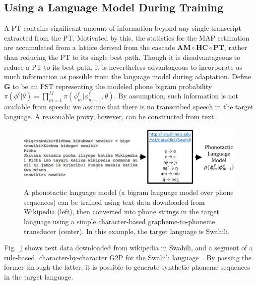 \subsection{Using a Language Model During Training}
\label{sec:trainwithlm}

A PT contains significant amount of information beyond any single
transcript extracted from the PT. Motivated by this, the statistics
for the MAP estimation are accumulated from a lattice derived from the
cascade $\mathbf{AM} \circ \mathbf{HC} \circ \mathbf{PT}$, rather than
reducing the PT to its single best path. Though it is disadvantageous
to reduce a PT to its best path, it is nevertheless advantageous to
incorporate as much information as possible from the language model
during adaptation.  Define $\mathbf{G}$ to be an FST representing the
modeled phone bigram probability
$\pi(\phi^\ell|\theta)=\prod_{m=1}^M\pi(\phi_m^\ell|\phi_{m-1}^\ell,\theta)$.
By assumption, such information is not available from speech: we
assume that there is no transcribed speech in the target language.  A
reasonable proxy, however, can be constructed from text.

\begin{figure}
  \centerline{\includegraphics[width=5in]{../figs/fig_sloan.png}}
  \caption{A phonotactic language model (a bigram language model over
    phone sequences) can be trained using text data downloaded from
    Wikipedia (left), then converted into phone strings in the target
    language using a simple character-based grapheme-to-phoneme
    transducer (center).  In this example, the target language is
    Swahili.}
  \label{fig:wikitext}
\end{figure}

Fig.~\ref{fig:wikitext} shows text data downloaded from wikipedia in
Swahili, and a segment of a rule-based, character-by-character G2P for
the Swahili language~\cite{Hasegawajohnson15}.  By passing the former
through the latter, it is possible to generate synthetic phoneme
sequences in the target language.

